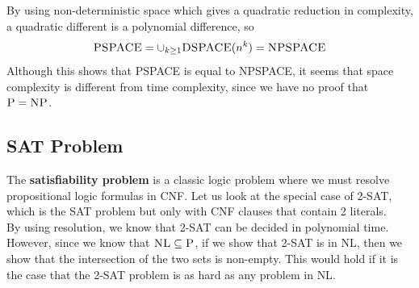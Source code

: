 \documentclass{article}
\theoremstyle{definition}
\newcommand{\n}[0]{\\[\baselineskip]}
\begin{document}
\noindent
By using non-deterministic space which gives a quadratic reduction in complexity, a quadratic different is a polynomial difference, so
\begin{equation}
\textsc{PSPACE} = \cup_{k \geq 1}\textsc{DSPACE}(n^k) = \textsc{NPSPACE}
\end{equation}
Although this shows that \textsc{PSPACE} is equal to \textsc{NPSPACE}, it seems that space complexity is different from time complexity, since we have no proof that $\textsc{P} = \textsc{NP}$.

\subsection{SAT Problem}
The \textbf{satisfiability problem} is a classic logic problem where we must resolve propositional logic formulas in CNF. Let us look at the special case of 2-SAT, which is the SAT problem but only with CNF clauses that contain 2 literals.
\n
By using resolution, we know that 2-SAT can be decided in polynomial time. However, since we know that $\textsc{NL} \subseteq \textsc{P}$, if we show that 2-SAT is in \textsc{NL}, then we show that the intersection of the two sets is non-empty. This would hold if it is the case that the 2-SAT problem is as hard as any problem in \textsc{NL}.
\end{document}

